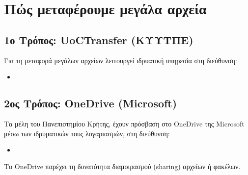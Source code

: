 \documentclass[letterpaper,10pt,greek]{sphinxhowto}
\begin{document}
\sphinxstepscope


\section{Πώς μεταφέρουμε μεγάλα αρχεία}
\label{\detokenize{HowToTransfer:id1}}\label{\detokenize{HowToTransfer::doc}}

\subsection{1ο Τρόπος: UoCTransfer (ΚΥΥΤΠΕ)}
\label{\detokenize{HowToTransfer:uoctransfer}}
\sphinxAtStartPar
Για τη μεταφορά μεγάλων αρχείων λειτουργεί ιδρυατική
υπηρεσία στη διεύθυνση:
\begin{itemize}
\item {} 
\sphinxAtStartPar
{}

\end{itemize}


\subsection{2ος Τρόπος: OneDrive (Microsoft)}
\label{\detokenize{HowToTransfer:onedrive-microsoft}}
\sphinxAtStartPar
Τα μέλη του Πανεπιστημίου Κρήτης, έχουν πρόσβαση στο OneDrive της Microsoft
μέσω των ιδρυματικών τους λογαριασμών, στη διεύθυνση:
\begin{itemize}
\item {} 
\sphinxAtStartPar
{}

\end{itemize}

\sphinxAtStartPar
Το OneDrive παρέχει τη δυνατότητα διαμοιρασμού (sharing) αρχείων ή φακέλων.



\renewcommand{\indexname}{Ευρετήριο}
\printindex
\end{document}

